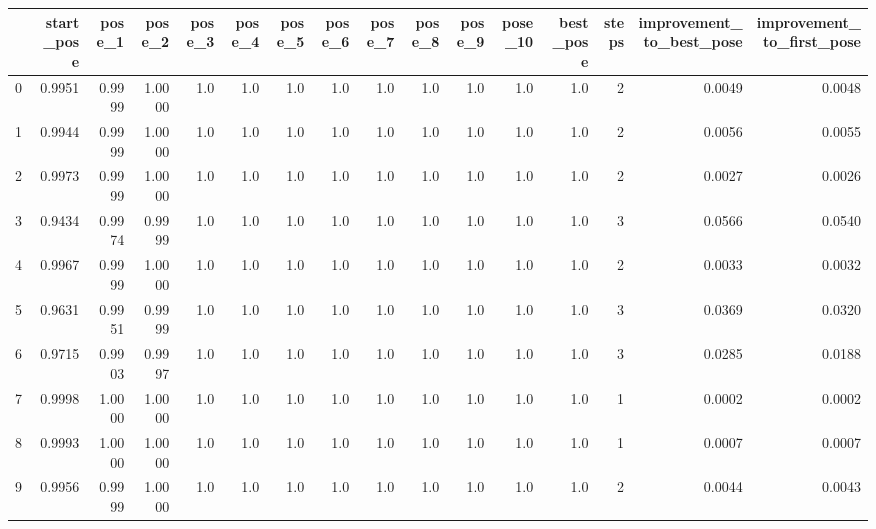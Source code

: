 \begin{tabular}{lrrrrrrrrrrrrrrr}
\toprule
{} &  start\_pose &  pose\_1 &  pose\_2 &  pose\_3 &  pose\_4 &  pose\_5 &  pose\_6 &  pose\_7 &  pose\_8 &  pose\_9 &  pose\_10 &  best\_pose &  steps &  improvement\_to\_best\_pose &  improvement\_to\_first\_pose \\
\midrule
0  &      0.9951 &  0.9999 &  1.0000 &     1.0 &     1.0 &     1.0 &     1.0 &     1.0 &     1.0 &     1.0 &      1.0 &        1.0 &      2 &                    0.0049 &                     0.0048 \\
1  &      0.9944 &  0.9999 &  1.0000 &     1.0 &     1.0 &     1.0 &     1.0 &     1.0 &     1.0 &     1.0 &      1.0 &        1.0 &      2 &                    0.0056 &                     0.0055 \\
2  &      0.9973 &  0.9999 &  1.0000 &     1.0 &     1.0 &     1.0 &     1.0 &     1.0 &     1.0 &     1.0 &      1.0 &        1.0 &      2 &                    0.0027 &                     0.0026 \\
3  &      0.9434 &  0.9974 &  0.9999 &     1.0 &     1.0 &     1.0 &     1.0 &     1.0 &     1.0 &     1.0 &      1.0 &        1.0 &      3 &                    0.0566 &                     0.0540 \\
4  &      0.9967 &  0.9999 &  1.0000 &     1.0 &     1.0 &     1.0 &     1.0 &     1.0 &     1.0 &     1.0 &      1.0 &        1.0 &      2 &                    0.0033 &                     0.0032 \\
5  &      0.9631 &  0.9951 &  0.9999 &     1.0 &     1.0 &     1.0 &     1.0 &     1.0 &     1.0 &     1.0 &      1.0 &        1.0 &      3 &                    0.0369 &                     0.0320 \\
6  &      0.9715 &  0.9903 &  0.9997 &     1.0 &     1.0 &     1.0 &     1.0 &     1.0 &     1.0 &     1.0 &      1.0 &        1.0 &      3 &                    0.0285 &                     0.0188 \\
7  &      0.9998 &  1.0000 &  1.0000 &     1.0 &     1.0 &     1.0 &     1.0 &     1.0 &     1.0 &     1.0 &      1.0 &        1.0 &      1 &                    0.0002 &                     0.0002 \\
8  &      0.9993 &  1.0000 &  1.0000 &     1.0 &     1.0 &     1.0 &     1.0 &     1.0 &     1.0 &     1.0 &      1.0 &        1.0 &      1 &                    0.0007 &                     0.0007 \\
9  &      0.9956 &  0.9999 &  1.0000 &     1.0 &     1.0 &     1.0 &     1.0 &     1.0 &     1.0 &     1.0 &      1.0 &        1.0 &      2 &                    0.0044 &                     0.0043 \\

\end{tabular}
